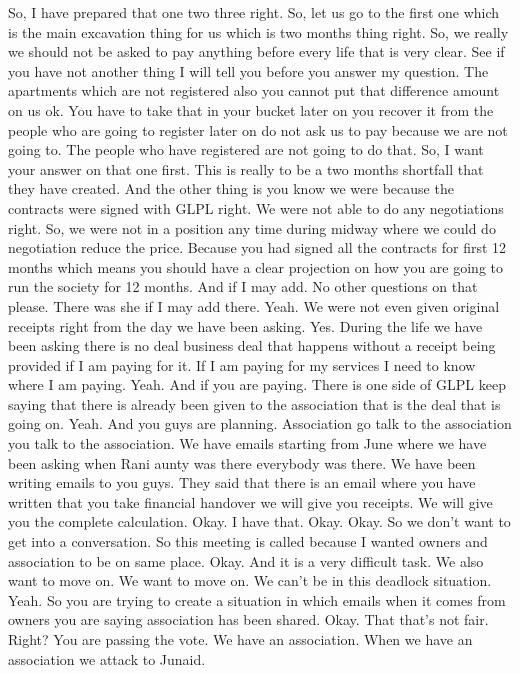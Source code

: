 So, I have prepared that one two three right. So, let us go to the first one which is the
main excavation thing for us which is two months thing right. So, we really we should
not be asked to pay anything before every life that is very clear. See if you have not
another thing I will tell you before you answer my question. The apartments which are not
registered also you cannot put that difference amount on us ok. You have to take that in
your bucket later on you recover it from the people who are going to register later on
do not ask us to pay because we are not going to. The people who have registered are not
going to do that. So, I want your answer on that one first.
This is really to be a two months shortfall that they have created.
And the other thing is you know we were because the contracts were signed with GLPL right.
We were not able to do any negotiations right. So, we were not in a position any time during
midway where we could do negotiation reduce the price. Because you had signed all the
contracts for first 12 months which means you should have a clear projection on how
you are going to run the society for 12 months. And if I may add.
No other questions on that please. There was she if I may add there.
Yeah. We were not even given original receipts right from the day we have been asking.
Yes.
During the life we have been asking there is no deal business deal that happens without
a receipt being provided if I am paying for it. If I am paying for my services I need to
know where I am paying. Yeah. And if you are paying.
There is one side of GLPL keep saying that there is already been given to the association
that is the deal that is going on. Yeah.
And you guys are planning. Association go talk to the association you talk to the association.
We have emails starting from June where we have been asking when Rani aunty was there
everybody was there. We have been writing emails to you guys.
They said that there is an email where you have written that you take financial handover
we will give you receipts. We will give you the complete calculation.
Okay. I have that. Okay.
Okay. So we don't want to get into a conversation.
So this meeting is called because I wanted owners and association to be on same place.
Okay. And it is a very difficult task.
We also want to move on. We want to move on.
We can't be in this deadlock situation. Yeah.
So you are trying to create a situation in which emails when it comes from owners
you are saying association has been shared. Okay.
That that's not fair. Right? You are passing the vote.
We have an association. When we have an association we attack to Junaid.
